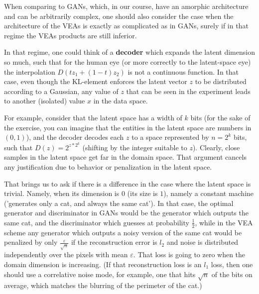 \documentclass{article}
\begin{document}
When comparing to GANs, which, in our course, have an amorphic architecture and can be arbitrarily complex, one should also consider the case when the architecture of the VEAs is exactly as complicated as in GANs, surely if in that regime the VEAs products are still inferior.

In that regime, one could think of a \textbf{decoder} which expands the latent dimension so much, such that for the human eye (or more correctly to the latent-space eye) the interpolation $D(tz_{1} + (1-t)z_{2})$ is not a continuous function. In that case, even though the KL-element enforces the latent vector $z$ to be distributed according to a Gaussian, any value of $z$ that can be seen in the experiment leads to another (isolated) value $x$ in the data space.

For example, consider that the latent space has a width of $k$ bits (for the sake of the exercise, you can imagine that the entities in the latent space are numbers in $(0,1)$), and the decoder decodes each $z$ to a space represented by $n = 2^{k}$ bits, such that $D(z) = 2^{ z * 2^{k} }$ (shifting by the integer suitable to $z$). Clearly, close samples in the latent space get far in the domain space. That argument cancels any justification due to behavior or penalization in the latent space.



That brings us to ask if there is a difference in the case where the latent space is trivial. Namely, when its dimension is $0$ (its size is $1$), namely a constant machine ('generates only a cat, and always the same cat'). In that case, the optimal generator and discriminator in GANs would be the generator which outputs the same cat, and the discriminator which guesses at probability $\frac{1}{2}$, while in the VEA scheme any generator which outputs a noisy version of the same cat would be penalized by only $\frac{\varepsilon}{\sqrt{n}}$ if the reconstruction error is $l_2$ and noise is distributed independently over the pixels with mean $\varepsilon$. That loss is going to zero when the domain dimension is increasing. (If that reconstruction loss is an $l_{1}$ loss, then one should use a correlative noise mode, for example, one that hits $\sqrt{n}$ of the bits on average, which matches the blurring of the perimeter of the cat.)
\end{document}
